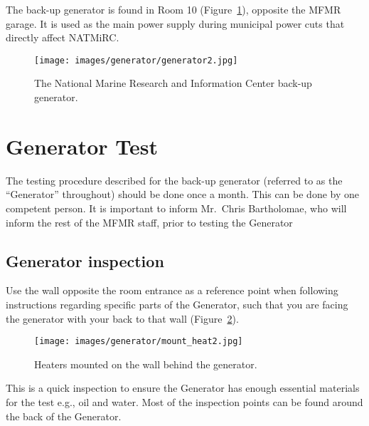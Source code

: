 \documentclass[
  letterpaper,
  DIV=11,
  numbers=noendperiod]{scrreprt}
\begin{document}
The back-up generator is found in Room 10 (Figure~\ref{fig-generator}),
opposite the MFMR garage. It is used as the main power supply during
municipal power cuts that directly affect NATMiRC.

\begin{figure}[H]

{\centering \texttt{[image: images/generator/generator2.jpg]}

}

\caption{\label{fig-generator}The National Marine Research and
Information Center back-up generator.}

\end{figure}

\hypertarget{generator-test}{%
\section{Generator Test}\label{generator-test}}

{The testing procedure described for the back-up generator (referred to
as the ``Generator'' throughout) should be done once a month}. {This can
be done by one competent person}. {It is important to inform Mr.~Chris
Bartholomae, who will inform the rest of the MFMR staff, prior to
testing the Generator}

\hypertarget{sec-gen-inspect}{%
\subsection{Generator inspection}\label{sec-gen-inspect}}

{Use the wall opposite the room entrance as a reference point when
following instructions regarding specific parts of the Generator, such
that you are facing the generator with your back to that wall}
(Figure~\ref{fig-mount-heat}).

\begin{figure}[H]

{\centering \texttt{[image: images/generator/mount\_heat2.jpg]}

}

\caption{\label{fig-mount-heat}Heaters mounted on the wall behind the
generator.}

\end{figure}

This is a quick inspection to ensure the Generator has enough essential
materials for the test e.g., oil and water. Most of the inspection
points can be found around the back of the Generator.
\end{document}
